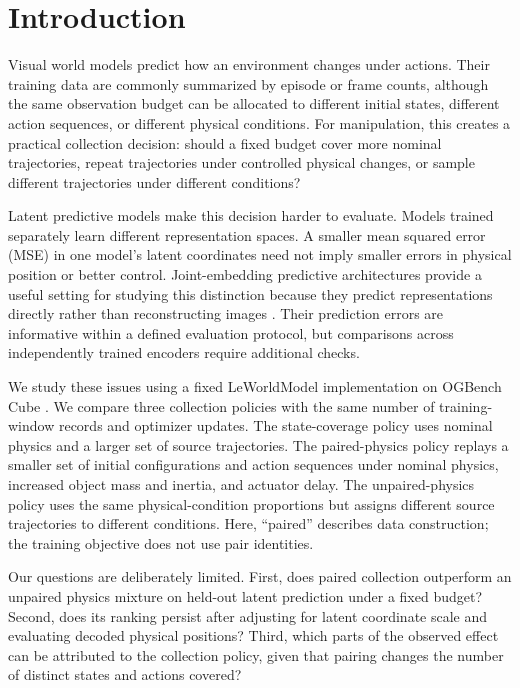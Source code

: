 \section{Introduction}
Visual world models predict how an environment changes under actions. Their training data are commonly summarized by episode or frame counts, although the same observation budget can be allocated to different initial states, different action sequences, or different physical conditions. For manipulation, this creates a practical collection decision: should a fixed budget cover more nominal trajectories, repeat trajectories under controlled physical changes, or sample different trajectories under different conditions?

Latent predictive models make this decision harder to evaluate. Models trained separately learn different representation spaces. A smaller mean squared error (MSE) in one model's latent coordinates need not imply smaller errors in physical position or better control. Joint-embedding predictive architectures provide a useful setting for studying this distinction because they predict representations directly rather than reconstructing images \cite{assran2023ijepa,maes2026leworldmodel}. Their prediction errors are informative within a defined evaluation protocol, but comparisons across independently trained encoders require additional checks.

We study these issues using a fixed LeWorldModel implementation on OGBench Cube \cite{maes2026leworldmodel,park2025ogbench}. We compare three collection policies with the same number of training-window records and optimizer updates. The state-coverage policy uses nominal physics and a larger set of source trajectories. The paired-physics policy replays a smaller set of initial configurations and action sequences under nominal physics, increased object mass and inertia, and actuator delay. The unpaired-physics policy uses the same physical-condition proportions but assigns different source trajectories to different conditions. Here, ``paired'' describes data construction; the training objective does not use pair identities.

Our questions are deliberately limited. First, does paired collection outperform an unpaired physics mixture on held-out latent prediction under a fixed budget? Second, does its ranking persist after adjusting for latent coordinate scale and evaluating decoded physical positions? Third, which parts of the observed effect can be attributed to the collection policy, given that pairing changes the number of distinct states and actions covered?

